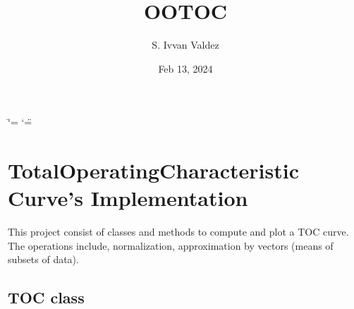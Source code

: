 \documentclass[letterpaper,10pt,english]{sphinxmanual}
\title{OOTOC}
\date{Feb 13, 2024}
\author{S.\@{} Ivvan Valdez}
\begin{document}
\ifdefined\shorthandoff
  \ifnum\catcode`\=\string=\active\shorthandoff{=}\fi
  \ifnum\catcode`\"=\active{}\fi
\fi

\pagestyle{empty}
\sphinxmaketitle
\pagestyle{plain}
\sphinxtableofcontents
\pagestyle{normal}
\label{\detokenize{index::doc}}


\sphinxstepscope


\chapter{Total\sphinxhyphen{}Operating\sphinxhyphen{}Characteristic Curve’s Implementation}
\label{\detokenize{usage:total-operating-characteristic-curve-s-implementation}}\label{\detokenize{usage::doc}}
\sphinxAtStartPar
This project consist of classes and methods to compute and plot a TOC curve. The operations include, normalization, approximation by vectors (means of subsets of data).


\section{TOC class}
\label{\detokenize{usage:toc-class}}
\end{document}

